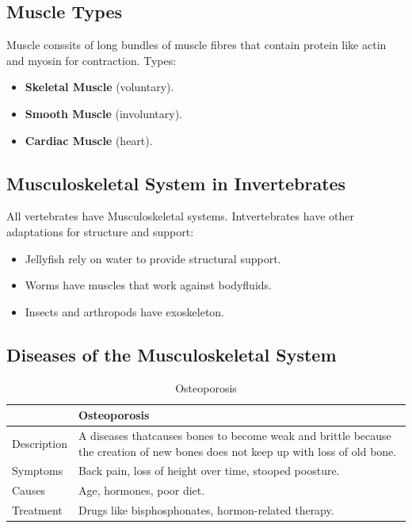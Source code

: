 \documentclass[12pt]{report}
\begin{document}
\subsection{Muscle Types}
\begin{definition}
    Muscle conssits of long bundles of muscle fibres that contain protein like actin and myosin for contraction. Types: 
    \begin{itemize}
        \item{ \textbf{Skeletal Muscle} (voluntary).}
        \item{ \textbf{Smooth Muscle} (involuntary).}
        \item{ \textbf{Cardiac Muscle} (heart).}
    \end{itemize}
\end{definition}

\subsection{Musculoskeletal System in Invertebrates}
\begin{definition}
    All vertebrates have Musculoskeletal systems. Intvertebrates have other adaptations for structure and support: 
    \begin{itemize}
        \item{Jellyfish rely on water to provide structural support.}
        \item{Worms have muscles that work against bodyfluids.}
        \item{Insects and arthropods have exoskeleton.}
    \end{itemize}
\end{definition}

\subsection{Diseases of the Musculoskeletal System}
\begin{table}[h!]
    \renewcommand{\arraystretch}{1.5}
    \setlength{\tabcolsep}{10pt}
    \setlength{\arrayrulewidth}{0.25mm}

    \begin{center}
        \vspace{0.5em}
        \begin{tabular}{|l|p{}|}
        \hline
         & Osteoporosis \\ 
        \hline
        Description & A diseases thatcauses bones to become weak and brittle because the creation of new bones does not keep up with loss of old bone. \\
        \hline
        Symptoms & Back pain, loss of height over time, stooped poosture.\\ 
        \hline 
        Causes & Age, hormones, poor diet.\\ 
        \hline 
        Treatment & Drugs like bisphosphonates, hormon-related therapy.\\ 
        \hline
        \end{tabular}
    \end{center}
    \caption{Osteoporosis}
\end{table}
\end{document}
